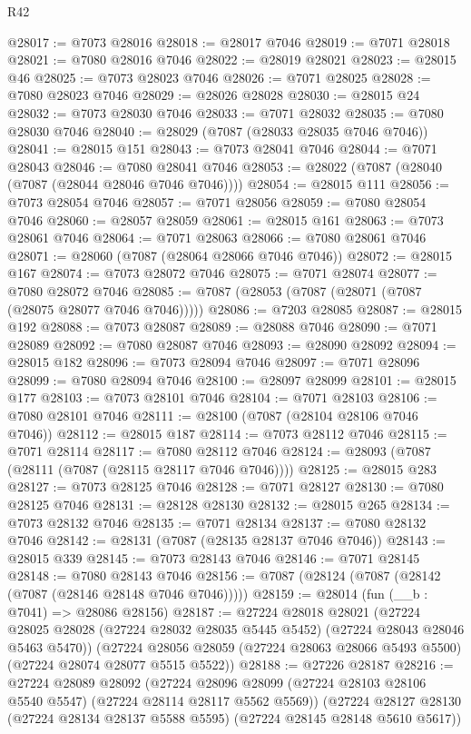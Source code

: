 \begin{lexlean}{R42}
\begin{coremodule}
{@28017 := @7073 @28016
@28018 := @28017 @7046
@28019 := @7071 @28018
@28021 := @7080 @28016 @7046
@28022 := @28019 @28021
@28023 := @28015 @46
@28025 := @7073 @28023 @7046
@28026 := @7071 @28025
@28028 := @7080 @28023 @7046
@28029 := @28026 @28028
@28030 := @28015 @24
@28032 := @7073 @28030 @7046
@28033 := @7071 @28032
@28035 := @7080 @28030 @7046
@28040 := @28029 (@7087 (@28033 @28035 @7046 @7046))
@28041 := @28015 @151
@28043 := @7073 @28041 @7046
@28044 := @7071 @28043
@28046 := @7080 @28041 @7046
@28053 := @28022 (@7087 (@28040 (@7087 (@28044 @28046 @7046 @7046))))
@28054 := @28015 @111
@28056 := @7073 @28054 @7046
@28057 := @7071 @28056
@28059 := @7080 @28054 @7046
@28060 := @28057 @28059
@28061 := @28015 @161
@28063 := @7073 @28061 @7046
@28064 := @7071 @28063
@28066 := @7080 @28061 @7046
@28071 := @28060 (@7087 (@28064 @28066 @7046 @7046))
@28072 := @28015 @167
@28074 := @7073 @28072 @7046
@28075 := @7071 @28074
@28077 := @7080 @28072 @7046
@28085 := @7087 (@28053 (@7087 (@28071 (@7087 (@28075 @28077 @7046 @7046)))))
@28086 := @7203 @28085
@28087 := @28015 @192
@28088 := @7073 @28087
@28089 := @28088 @7046
@28090 := @7071 @28089
@28092 := @7080 @28087 @7046
@28093 := @28090 @28092
@28094 := @28015 @182
@28096 := @7073 @28094 @7046
@28097 := @7071 @28096
@28099 := @7080 @28094 @7046
@28100 := @28097 @28099
@28101 := @28015 @177
@28103 := @7073 @28101 @7046
@28104 := @7071 @28103
@28106 := @7080 @28101 @7046
@28111 := @28100 (@7087 (@28104 @28106 @7046 @7046))
@28112 := @28015 @187
@28114 := @7073 @28112 @7046
@28115 := @7071 @28114
@28117 := @7080 @28112 @7046
@28124 := @28093 (@7087 (@28111 (@7087 (@28115 @28117 @7046 @7046))))
@28125 := @28015 @283
@28127 := @7073 @28125 @7046
@28128 := @7071 @28127
@28130 := @7080 @28125 @7046
@28131 := @28128 @28130
@28132 := @28015 @265
@28134 := @7073 @28132 @7046
@28135 := @7071 @28134
@28137 := @7080 @28132 @7046
@28142 := @28131 (@7087 (@28135 @28137 @7046 @7046))
@28143 := @28015 @339
@28145 := @7073 @28143 @7046
@28146 := @7071 @28145
@28148 := @7080 @28143 @7046
@28156 := @7087 (@28124 (@7087 (@28142 (@7087 (@28146 @28148 @7046 @7046)))))
@28159 := @28014 (fun (__b : @7041) => @28086 @28156)
@28187 := @27224
    @28018
    @28021
    (@27224 @28025 @28028 (@27224 @28032 @28035 @5445 @5452) (@27224 @28043 @28046 @5463 @5470))
    (@27224 @28056 @28059 (@27224 @28063 @28066 @5493 @5500) (@27224 @28074 @28077 @5515 @5522))
@28188 := @27226 @28187
@28216 := @27224
    @28089
    @28092
    (@27224 @28096 @28099 (@27224 @28103 @28106 @5540 @5547) (@27224 @28114 @28117 @5562 @5569))
    (@27224 @28127 @28130 (@27224 @28134 @28137 @5588 @5595) (@27224 @28145 @28148 @5610 @5617))
}
\end{coremodule}
\end{lexlean}
